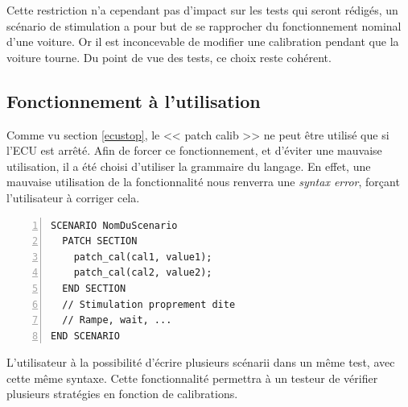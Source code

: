 		Cette restriction n'a cependant pas d'impact sur les tests qui seront rédigés, un scénario de stimulation a pour but de se rapprocher du fonctionnement nominal d'une voiture. Or il est inconcevable de modifier une calibration pendant que la voiture tourne. Du point de vue des tests, ce choix reste cohérent. 

\subsection{Fonctionnement à l'utilisation}\label{usePatch}
\vspace{-15px}
Comme vu section \ref{ecustop}, le << patch calib >> ne peut être utilisé que si l'ECU est arrêté. Afin de forcer ce fonctionnement, et d'éviter une mauvaise utilisation, il a été choisi d'utiliser la grammaire du langage. En effet, une mauvaise utilisation de la fonctionnalité nous renverra une \textit{syntax error}, forçant l'utilisateur à corriger cela. 

\begin{lstlisting}[language=gtl,numbers=left,caption=Scénario de stimulation contenant des patchs de calibration]
SCENARIO NomDuScenario
  PATCH SECTION
    patch_cal(cal1, value1);
    patch_cal(cal2, value2);
  END SECTION
  // Stimulation proprement dite
  // Rampe, wait, ...
END SCENARIO
\end{lstlisting}
L'utilisateur à la possibilité d'écrire plusieurs scénarii dans un même test, avec cette même syntaxe. Cette fonctionnalité permettra à un testeur de vérifier plusieurs stratégies en fonction de calibrations.
\vspace{-40px}
